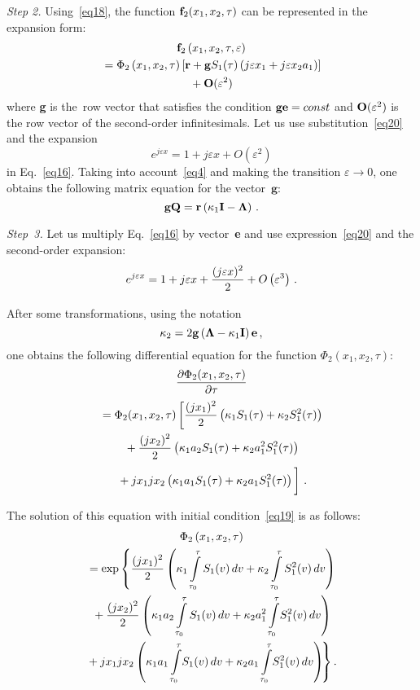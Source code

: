 \begin{multicols}{2}
\textit{Step 2.} Using~\eqref{eq18}, the function ${\bf f}_2(x_1,x_2,\tau)$  
can be represented in the expansion form:
\begin{multline}
{\bf f}_2\left(x_1,x_2,\tau,\varepsilon\right)\\
{}=\Phi_2\left(x_1,x_2,\tau\right)\left[{\bf r}+\mathbf{g}S_1(\tau)
\left(j\varepsilon x_1+j\varepsilon x_2a_1\right)\right]\\
{}+{\bf O}(\varepsilon^2)
\label{eq20}
\end{multline}
where {\bf g} is the~row vector that satisfies the condition ${\bf ge}= const$ 
and ${\bf O}(\varepsilon^2)$  is the row vector of the second-order infinitesimals. 
Let us use substitution~\eqref{eq20} and the expansion
$$
e^{j\varepsilon x}=1+j\varepsilon x+O\left( \varepsilon^2\right) 
$$
in Eq.~\eqref{eq16}. Taking into account~\eqref{eq4} and 
making the transition $\varepsilon\to 0$, one obtains the 
following matrix equation for the vector~$\mathbf{g}$:
$$
{\bf gQ}={\bf r}\left(\kappa_1\mathbf{I}-\mathbf{\Lambda}\right)\,.
$$

\textit{Step~3.} Let us multiply Eq.~\eqref{eq16} by vector~\textbf{e} 
and use expression~\eqref{eq20} and the second-order expansion:
$$
e^{j\varepsilon x}=1+j\varepsilon x+\displaystyle\frac{\displaystyle (j\varepsilon x)^2\mathstrut}{\displaystyle 2\mathstrut}+O\left(\varepsilon^3\right)\,.
$$

After some transformations, using the notation
$$
\kappa_2=2{\bf g}\left(\mathbf{\Lambda}-\kappa_1\mathbf{I}\right){\bf{e}}\,,
$$
one obtains the following differential equation for the function $\Phi_2(x_1,x_2,\tau)$:
\begin{multline*}
\fr{\partial\Phi_2(x_1,x_2,\tau)}{\partial\tau}\\
{}=
\Phi_2(x_1,x_2,\tau) \left[\fr{(jx_1)^2}{2}\left(\kappa_1S_1(\tau)+
\kappa_2S_1^2(\tau)\right)\right.
\\
{}+\fr{(jx_2)^2}{2}\left(\kappa_1a_2S_1(\tau)+\kappa_2a_1^2S_1^2(\tau)\right)\\
\left.{}+jx_1jx_2\left(\kappa_1a_1S_1(\tau)+\kappa_2a_1S_1^2(\tau)\right)
\vphantom{\fr{(jx_1)^2}{2}}\right]\,.
\end{multline*}

The solution of this equation with initial condition~\eqref{eq19} is as follows:
\begin{multline*}
\Phi_2\left(x_1,x_2,\tau\right)\\
{}= 
\exp\left\{ \displaystyle\frac{\displaystyle (jx_1)^2\mathstrut}{\displaystyle 2\mathstrut}\left(
\kappa_1\int\limits_{\tau_0}^{\tau}S_1(v)\,dv+\kappa_2\int\limits_{\tau_0}^{\tau}
S_1^2(v)\,dv\right)\right.
\\
{}+\displaystyle\frac{\displaystyle (jx_2)^2\mathstrut}{\displaystyle 2\mathstrut}\left(\kappa_1a_2\int\limits_{\tau_0}^{\tau}S_1(v)\,dv+
\kappa_2a_1^2\int\limits_{\tau_0}^{\tau}\!S_1^2(v)\,dv\right)
\\
\!\left.{}+
jx_1jx_2\left(\kappa_1a_1\int\limits_{\tau_0}^{\tau}\!S_1(v)\,dv+
\kappa_2a_1\int\limits_{\tau_0}^{\tau}\!S_1^2(v)\,dv\right)\!\right\}.\hspace*{-0.39064pt}
\end{multline*}


\end{multicols}
